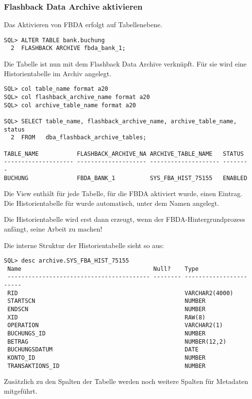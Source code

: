         \subsubsection{Flashback Data Archive aktivieren}
        \label{enablefbda}
          Das Aktivieren von FBDA erfolgt auf Tabellenebene.
          \begin{lstlisting}[caption={Flashback Data Archive aktivieren},label=admin1728,language=oracle_sql]
SQL> ALTER TABLE bank.buchung
  2  FLASHBACK ARCHIVE fbda_bank_1;
          \end{lstlisting}
          Die Tabelle  ist nun mit dem Flashback Data Archive  verknüpft. Für sie wird eine Historientabelle im Archiv angelegt.
          \begin{lstlisting}[caption={Wo ist die Historientabelle?},label=admin1729,language=oracle_sql,alsolanguage=sqlplus]
SQL> col table_name format a20
SQL> col flashback_archive_name format a20
SQL> col archive_table_name format a20

SQL> SELECT table_name, flashback_archive_name, archive_table_name, status
  2  FROM   dba_flashback_archive_tables;

TABLE_NAME           FLASHBACK_ARCHIVE_NA ARCHIVE_TABLE_NAME   STATUS
-------------------- -------------------- -------------------- --------
BUCHUNG              FBDA_BANK_1          SYS_FBA_HIST_75155   ENABLED
          \end{lstlisting}
          Die View  enthält für jede Tabelle, für die FBDA aktiviert wurde, einen Eintrag. Die Historientabelle für  wurde automatisch, unter dem Namen  angelegt.
          \begin{merke}
            Die Historientabelle wird erst dann erzeugt, wenn der FBDA-Hintergrundprozess anfängt, seine Arbeit zu machen!
          \end{merke}
          Die interne Struktur der Historientabelle sieht so aus:
          \begin{lstlisting}[caption={Die Struktur der Historientabelle},label=admin1730,emph={[9]VARCHAR2,NUMBER,RAW,DATE},emphstyle={[9]\color{black}},language=oracle_sql,alsolanguage=sqlplus]
SQL> desc archive.SYS_FBA_HIST_75155
 Name                                      Null?    Type
 ----------------------------------------- -------- -----------------------
 RID                                                VARCHAR2(4000)
 STARTSCN                                           NUMBER
 ENDSCN                                             NUMBER
 XID                                                RAW(8)
 OPERATION                                          VARCHAR2(1)
 BUCHUNGS_ID                                        NUMBER
 BETRAG                                             NUMBER(12,2)
 BUCHUNGSDATUM                                      DATE
 KONTO_ID                                           NUMBER
 TRANSAKTIONS_ID                                    NUMBER
          \end{lstlisting}
          Zusätzlich zu den Spalten der Tabelle  werden noch weitere Spalten für Metadaten mitgeführt.

